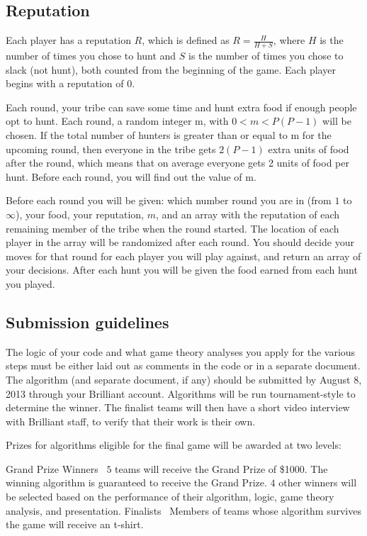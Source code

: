 \documentclass[10pt,fleqn]{article}
\begin{document}
\subsection{Reputation}

Each player has a reputation $R$, which is defined as $R=\frac{H}{H+S}$, where
$H$ is the number of times you chose to hunt and $S$ is the number of times you
chose to slack (not hunt), both counted from the beginning of the game. Each
player begins with a reputation of $0$.

Each round, your tribe can save some time and hunt extra food if enough people
opt to hunt. Each round, a random integer m, with $0<m<P(P-1)$ will be chosen.
If the total number of hunters is greater than or equal to m for the upcoming
round, then everyone in the tribe gets $2(P-1)$ extra units of food after the
round, which means that on average everyone gets 2 units of food per hunt.
Before each round, you will find out the value of m.

Before each round you will be given: which number round you are in (from $1$ to
$\infty$), your food, your reputation, $m$, and an array with the reputation of
each remaining member of the tribe when the round started. The location of each
player in the array will be randomized after each round. You should decide your
moves for that round for each player you will play against, and return an array
of your decisions. After each hunt you will be given the food earned from each
hunt you played.

\subsection{Submission guidelines}

The logic of your code and what game theory analyses you apply for the various
steps must be either laid out as comments in the code or in a separate
document. The algorithm (and separate document, if any) should be submitted by
August 8, 2013 through your Brilliant account. Algorithms will be run
tournament-style to determine the winner. The finalist teams will then have a
short video interview with Brilliant staff, to verify that their work is their
own.

Prizes for algorithms eligible for the final game will be awarded at two
levels:

Grand Prize Winners \dash\ $5$ teams will receive the Grand Prize of \$1000.
The winning algorithm is guaranteed to receive the Grand Prize. $4$ other winners
will be selected based on the performance of their algorithm, logic, game
theory analysis, and presentation.  Finalists \dash\ Members of teams whose
algorithm survives the game will receive an  t-shirt.
\end{document}
